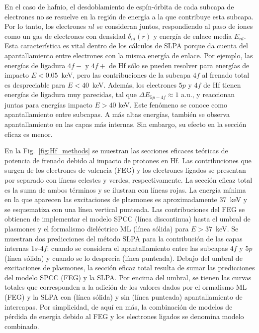 En el caso de hafnio, el desdoblamiento de espín-órbita de cada subcapa 
de electrones no se resuelve en la región de energía a la que contribuye 
esta subcapa. Por lo tanto, los electrones $nl$ se consideran juntos, 
respondiendo al paso de iones como un gas de electrones con densidad 
$\delta_{nl}(r)$ y energía de enlace media $E_{nl}$. Esta característica 
es vital dentro de los cálculos de SLPA porque da cuenta del 
apantallamiento entre electrones con la misma energía de enlace.
Por ejemplo, las energías de ligadura $4f-$ y $4f+$ de Hf sólo se 
pueden resolver para energías de impacto $E<0.05$~keV, pero las 
contribuciones de la subcapa $4f$ al frenado total es despreciable para
$E<40$~keV. Además, los electrones $5p$ y $4f$ de Hf tienen energías de 
ligadura muy parecidas, tal que $\Delta E_{5p-4f} \approx 1$ a.u., y 
reaccionan juntas para energías impacto $E>40$ keV. Este fenómeno se 
conoce como apantallamiento entre subcapas. A más altas energías, 
también se observa apantallamiento en las capas más internas. Sin 
embargo, su efecto en la sección eficaz es menor.

En la Fig.~\ref{fig:Hf_methods} se muestran las secciones eficaces 
teóricas de potencia de frenado debido al impacto de protones en Hf. 
Las contribuciones que surgen de los electrones de valencia (FEG) y los
electrones ligados se presentan por separado con líneas celestes y 
verdes, respectivamente. La sección eficaz total es la suma de ambos 
términos y se ilustran con líneas rojas. La energía mínima en la que 
aparecen las excitaciones de plasmones es aproximadamente 37~keV y se 
esquematiza con una línea vertical punteada. Las contribuciones del FEG 
se obtienen de implementar el modelo SPCC (línea discontinua) hasta el 
umbral de plasmones y el formalismo dieléctrico ML (línea sólida) para 
$E>37$~keV. Se muestran dos predicciones del método SLPA para la 
contribución de las capas internas $1s$-$4f$: cuando se considera el 
apantallamiento entre las subcapas $4f$ y $5p$ (línea sólida) y cuando 
se lo desprecia (línea punteada). Debajo del umbral de excitaciones de 
plasmones, la sección eficaz total resulta de sumar las predicciones del 
modelo SPCC (FEG) y la SLPA. Por encima del umbral, se tienen las curvas 
totales que corresponden a la adición de los valores dados por el 
ormalismo ML (FEG) y la SLPA con (línea sólida) y sin (línea punteada) 
apantallamiento de intercapas. Por simplicidad, de aquí en más, la 
combinación de modelos de pérdida de energía debido al FEG y los 
electrones ligados se denomina modelo combinado.

